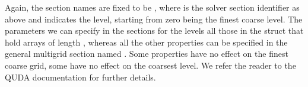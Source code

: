 Again, the section names are fixed to be , where  is the solver section identifier as above and  indicates the level, starting from zero being the finest coarse level. The parameters we can specify in the sections for the levels all those in the  struct that hold arrays of length , whereas all the other properties can be specified in the general multigrid section named . Some properties have no effect on the finest coarse grid, some have no effect on the coarsest level. We refer the reader to the QUDA documentation for further details.

